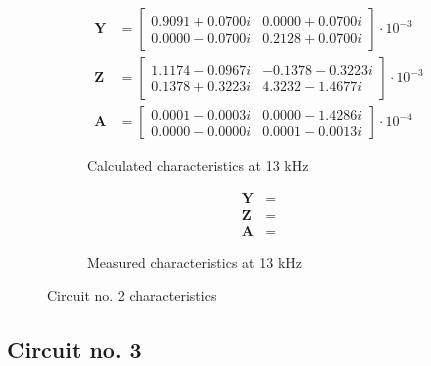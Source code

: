 \documentclass[notitlepage, a4paper, 11pt]{article}
\begin{document}
\begin{figure}[H]
\begin{subfigure}{0.45\textwidth}
\begin{align*}
				\mathbf{Y} &= 
				\begin{bmatrix}
					0.9091 + 0.0700i  & 0.0000 + 0.0700i \\
					0.0000 - 0.0700i  & 0.2128 + 0.0700i
				\end{bmatrix}
				\cdot 10^{-3}
				\\
				\mathbf{Z} &= 
				\begin{bmatrix}
					1.1174 - 0.0967i & -0.1378 - 0.3223i \\
					0.1378 + 0.3223i & 4.3232 - 1.4677i
				\end{bmatrix}
				\cdot 10^{-3}
				\\
				\mathbf{A} &= 
				\begin{bmatrix}
					0.0001 - 0.0003i & 0.0000 - 1.4286i \\
					0.0000 - 0.0000i & 0.0001 - 0.0013i
				\end{bmatrix}
				\cdot 10^{-4}
			\end{align*}
			\caption{Calculated characteristics at 13 kHz}
		\end{subfigure}
		\hfill
		\begin{subfigure}{0.45\textwidth}
			\begin{align*}
				\mathbf{Y} &= 
				\\
				\mathbf{Z} &= 		
				\\
				\mathbf{A} &= 
			\end{align*}
			\caption{Measured characteristics at 13 kHz}
		\end{subfigure}
		\caption{Circuit no. 2 characteristics}
	\end{figure}
	
	\subsection{Circuit no. 3}
	
\end{document}
